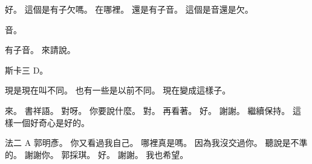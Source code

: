 \hypertarget{c01:cue:2221}{}好。
\hypertarget{c01:cue:2222}{}這個是有子欠嗎。
\hypertarget{c01:cue:2223}{}在哪裡。
\hypertarget{c01:cue:2224}{}還是有子音。
\hypertarget{c01:cue:2225}{}這個是音還是欠。

\hypertarget{c01:cue:2226}{}音。

\hypertarget{c01:cue:2227}{}有子音。
\hypertarget{c01:cue:2228}{}來請說。

\hypertarget{c01:cue:2229}{}斯卡三 D。

\hypertarget{c01:cue:2230}{}現是現在叫不同。
\hypertarget{c01:cue:2231}{}也有一些是以前不同。
\hypertarget{c01:cue:2232}{}現在變成這樣子。

\hypertarget{c01:cue:2233}{}來。
\hypertarget{c01:cue:2234}{}書祥語。
\hypertarget{c01:cue:2235}{}對呀。
\hypertarget{c01:cue:2236}{}你要說什麼。
\hypertarget{c01:cue:2237}{}對。
\hypertarget{c01:cue:2238}{}再看著。
\hypertarget{c01:cue:2239}{}好。
\hypertarget{c01:cue:2240}{}謝謝。
\hypertarget{c01:cue:2241}{}繼續保持。
\hypertarget{c01:cue:2242}{}這樣一個好奇心是好的。

\hypertarget{c01:cue:2243}{}法二 A 郭明彥。
\hypertarget{c01:cue:2244}{}你又看過我自己。
\hypertarget{c01:cue:2245}{}哪裡真是嗎。
\hypertarget{c01:cue:2246}{}因為我沒交過你。
\hypertarget{c01:cue:2247}{}聽說是不準的。
\hypertarget{c01:cue:2248}{}謝謝你。
\hypertarget{c01:cue:2249}{}郭採琪。
\hypertarget{c01:cue:2250}{}好。
\hypertarget{c01:cue:2251}{}謝謝。
\hypertarget{c01:cue:2252}{}我也希望。

